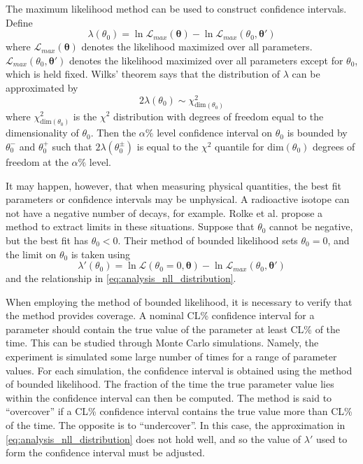 \documentclass[herrin-thesis.tex]{subfiles}
\begin{document}
The maximum likelihood method can be used to construct confidence intervals. Define
\begin{equation}
\lambda({\theta_0}) = \ln \mathcal{L}_{max}(\boldsymbol{\theta}) - \ln \mathcal{L}_{max}(\theta_0, \boldsymbol{\theta}')
\end{equation}
where \(\mathcal{L}_{max}(\boldsymbol{\theta})\) denotes the likelihood maximized over all parameters. \(\mathcal{L}_{max}(\theta_0, \boldsymbol{\theta}')\) denotes the likelihood maximized over all parameters except for \(\theta_0\), which is held fixed. Wilks' theorem \cite{Wilks:1938uq} says that the distribution of \(\lambda\) can be approximated by
\begin{equation}
2\lambda(\theta_0) \sim \chi^2_{\text{dim}(\theta_0)}
\label{eq:analysis_nll_distribution}
\end{equation}
where \(\chi^2_{\text{dim}(\theta_0)}\) is the \(\chi^2\) distribution with degrees of freedom equal to the dimensionality of \(\theta_0\). Then the \(\alpha\%\) level confidence interval on \(\theta_0\) is bounded by \(\theta_0^-\) and \(\theta_0^+\) such that \(2\lambda(\theta_0^\pm)\) is equal to the \(\chi^2\) quantile for \(\text{dim}(\theta_0)\) degrees of freedom at the \(\alpha\%\) level.

It may happen, however, that when measuring physical quantities, the best fit parameters or confidence intervals may be unphysical. A radioactive isotope can not have a negative number of decays, for example. Rolke et al. \cite{Rolke:2005uq} propose a method to extract limits in these situations. Suppose that \(\theta_0\) cannot be negative, but the best fit has \(\theta_0 < 0\). Their method of bounded likelihood sets \(\theta_0 = 0\), and the limit on \(\theta_0\) is taken using
\begin{equation}
\lambda'({\theta_0}) = \ln \mathcal{L}(\theta_0 = 0, \boldsymbol{\theta}) - \ln \mathcal{L}_{max}(\theta_0, \boldsymbol{\theta}')
\end{equation}
and the relationship in \cref{eq:analysis_nll_distribution}.

When employing the method of bounded likelihood, it is necessary to verify that the method provides coverage. A nominal CL\% confidence interval for a parameter should contain the true value of the parameter at least CL\% of the time. This can be studied through Monte Carlo simulations. Namely, the experiment is simulated some large number of times for a range of parameter values. For each simulation, the confidence interval is obtained using the method of bounded likelihood. The fraction of the time the true parameter value lies within the confidence interval can then be computed. The method is said to ``overcover'' if a CL\% confidence interval contains the true value more than CL\% of the time. The opposite is to ``undercover''. In this case, the approximation in \cref{eq:analysis_nll_distribution} does not hold well, and so the value of \(\lambda'\) used to form the confidence interval must be adjusted.
\end{document}

